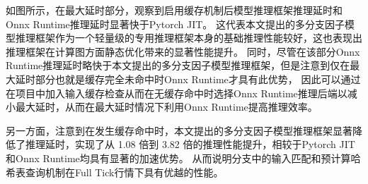 如图所示，在最大延时部分，观察到启用缓存机制后模型推理框架推理延时和Onnx Runtime推理延时显著快于Pytorch JIT。
这代表本文提出的多分支因子模型推理框架作为一个轻量级的专用推理框架本身的基础推理性能较好，这也表现出推理框架在计算图方面静态优化带来的显著性能提升。
同时，尽管在该部分Onnx Runtime推理延时略快于本文提出的多分支因子模型推理框架，但是注意到仅在最大延时部分也就是缓存完全未命中时Onnx Runtime才具有此优势，
因此可以通过在项目中加入输入缓存检查从而在无缓存命中时选择Onnx Runtime推理后端以减小最大延时，从而在最大延时情况下利用Onnx Runtime提高推理效率。

另一方面，注意到在发生缓存命中时，本文提出的多分支因子模型推理框架显著降低了推理延时，实现了从 1.08 倍到 3.82 倍的推理性能提升，相较于Pytorch JIT和Onnx Runtime均具有显著的加速优势。
从而说明分支中的输入匹配和预计算哈希表查询机制在Full Tick行情下具有优越的性能。
